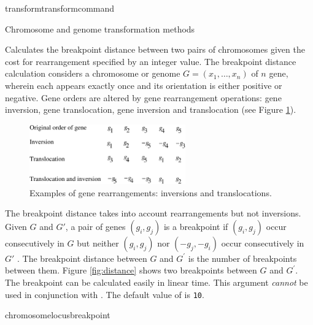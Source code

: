 \begin{command}{transform}{transformcommand}
\begin{arguments}
\begin{argumentgroup}{Chromosome and genome transformation methods}
{Calculates the breakpoint distance \cite{blanchetteetal1997}
between two pairs of chromosomes given the cost for rearrangement
specified by an integer value. The breakpoint distance calculation considers
a chromosome or genome $G = (x_1, \ldots, x_n) $ of $n$ gene, wherein each
appears exactly once and its orientation is either positive or negative. Gene
orders are altered by gene rearrangement operations: gene inversion, gene translocation,
gene inversion and translocation (see Figure \ref{fig:genomeRearrangement}). 
\bigskip
\begin{figure} [!htbp]
\begin{center}
\includegraphics[width=0.6\textwidth]{doc/figures/genomeRearrangement.pdf}
\end{center}
\caption{Examples of gene rearrangements: inversions and translocations.}
\label{fig:genomeRearrangement}
\end{figure}

The breakpoint distance takes into account rearrangements but not inversions.
Given $G$ and $G'$, a pair of genes $(g_i, g_j)$ is a breakpoint if $(g_i, g_j)$ occur 
consecutively in $G$ but neither $(g_i, g_j)$ nor $(-g_j, -g_i)$ occur
consecutively in $G'$ \cite{sankoffandblanchette1998}. The breakpoint distance between $G$
and $G^\prime$ is the number of breakpoints between them. Figure \ref{fig:distance} 
shows two breakpoints between $G$ and $G^\prime$. The breakpoint can be calculated 
easily in linear time. This argument \emph{cannot} be used in
conjunction with . %
The default value of  is \texttt{10}.} 
{chromosomelocusbreakpoint} 



\end{argumentgroup}
\end{arguments}
\end{command}

